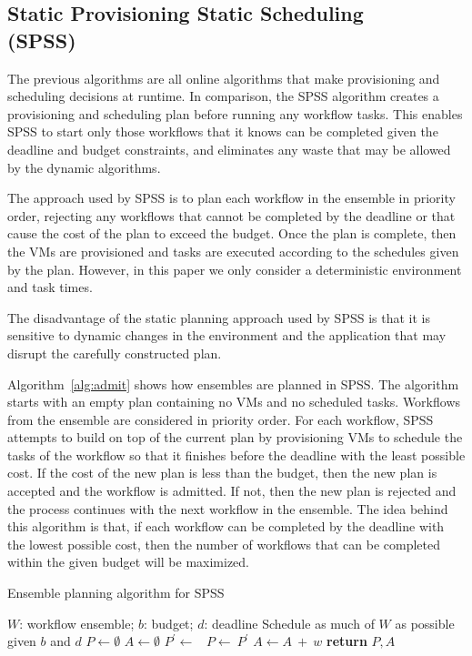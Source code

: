 \documentclass{sig-alternate}
\begin{document}
\subsection{Static Provisioning Static Scheduling \\(SPSS)}

The previous algorithms are all online algorithms that make provisioning 
and scheduling decisions at runtime. In comparison, the SPSS algorithm 
creates a provisioning and scheduling plan before running any workflow tasks.
This enables SPSS to start only those workflows that it knows can be completed
given the deadline and budget constraints, and eliminates any waste that may
be allowed by the dynamic algorithms.

The approach used by SPSS is to plan each workflow in the ensemble in priority 
order, rejecting any workflows that cannot be completed by the deadline or that 
cause the cost of the plan to exceed the budget. Once the plan is complete, then 
the VMs are provisioned and tasks are executed according to the schedules given
by the plan. However, in this paper we only consider a deterministic environment and task times.

The disadvantage of the static planning approach used by SPSS is that it is 
sensitive to dynamic changes in the environment and the application that may 
disrupt the carefully constructed plan.

Algorithm~\ref{alg:admit} shows how ensembles are planned in SPSS. The algorithm
starts with an empty plan containing no VMs and no scheduled tasks. Workflows
from the ensemble are considered in priority order. For each workflow, SPSS
attempts to build on top of the current plan by provisioning VMs to schedule 
the tasks of the workflow so that it finishes before the deadline with the least
possible cost. If the cost of the new plan is less than the budget, then the 
new plan is accepted and the workflow is admitted. If not, then the new plan is 
rejected and the process continues with the next workflow in the ensemble. The 
idea behind this algorithm is that, if each workflow can be completed by the 
deadline with the lowest possible cost, then the number of workflows that can 
be completed within the given budget will be maximized.

\begin{algorithm}
\caption{Ensemble planning algorithm for SPSS}
\label{alg:admit}
\begin{algorithmic}[1]
\Require $W$: workflow ensemble; $b$: budget; $d$: deadline
\Ensure Schedule as much of $W$ as possible given $b$ and $d$
    \State $P\gets \emptyset$ 
    \State $A\gets \emptyset$ 
        \State $P^\prime \gets$\ 
            \State $P\gets\ P^\prime$ 
            \State $A \gets A\ +\ w$ 
        \EndIf
    \EndFor
    \State \textbf{return} $P,A$
\EndProcedure
\end{algorithmic}
\end{algorithm}
\end{document}
